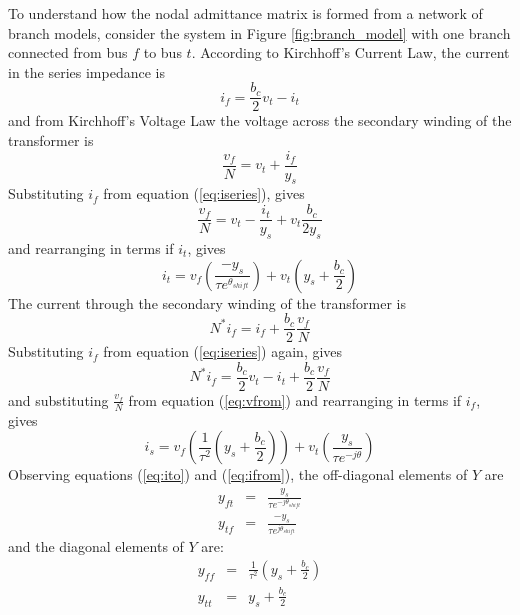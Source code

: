 
To understand how the nodal admittance matrix is formed from a network of branch
models, consider the system in Figure \ref{fig:branch_model} with one branch
connected from bus $f$ to bus $t$. According to Kirchhoff's Current Law, the
current in the series impedance is
\begin{equation}
\label{eq:iseries}
i_f = \frac{b_c}{2}v_t - i_t
\end{equation}
and from Kirchhoff's Voltage Law the voltage across the secondary winding of
the transformer is
\begin{equation}
\frac{v_{f}}{N} = v_t + \frac{i_f}{y_s}
\end{equation}
Substituting $i_f$ from equation (\ref{eq:iseries}), gives
\begin{equation}
\label{eq:vfrom}
\frac{v_{f}}{N} = v_t - \frac{i_t}{y_s} + v_t\frac{b_c}{2y_s}
\end{equation}
and rearranging in terms if $i_t$, gives
\begin{equation}
\label{eq:ito}
i_t = v_f \left( \frac{-y_s}{\tau e^{\theta_{shift}}} \right) +
v_t \left( y_s + \frac{b_c}{2} \right)
\end{equation}
The current through the secondary winding of the transformer is
\begin{equation}
N^*i_f = i_f + \frac{b_c}{2}\frac{v_{f}}{N}
\end{equation}
Substituting $i_f$ from equation (\ref{eq:iseries}) again, gives
\begin{equation}
N^*i_f = \frac{b_c}{2}v_t - i_t + \frac{b_c}{2}\frac{v_{f}}{N}
\end{equation}
and substituting $\frac{v_{f}}{N}$ from equation (\ref{eq:vfrom}) and
rearranging in terms if $i_f$, gives
\begin{equation}
\label{eq:ifrom}
i_s = v_f \left( \frac{1}{\tau^2} \left(y_s + \frac{b_c}{2}\right) \right) +
v_t \left(\frac{y_s}{\tau e^{-j\theta}}\right)
\end{equation}
Observing equations (\ref{eq:ito}) and (\ref{eq:ifrom}), the
off-diagonal elements of $Y$ are
\begin{eqnarray}
y_{ft}& =& \frac{y_s}{\tau e^{-j\theta_{shift}}}\\
y_{tf}& =& \frac{-y_s}{\tau e^{j\theta_{shift}}}
\end{eqnarray}
and the diagonal elements of $Y$ are:
\begin{eqnarray}
y_{ff}& =& \frac{1}{\tau^2} \left(y_s + \frac{b_c}{2}\right)\\
y_{tt}& =& y_s + \frac{b_c}{2}
\end{eqnarray}
